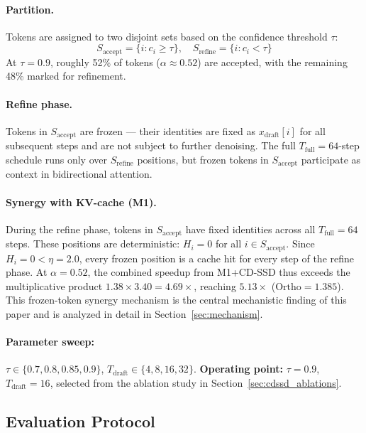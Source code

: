 \documentclass{article}
\newcommand{\ortho}{\text{Ortho}}
\newcommand{\Saccept}{S_{\text{accept}}}
\newcommand{\Srefine}{S_{\text{refine}}}
\newcommand{\Tdraft}{T_{\text{draft}}}
\newcommand{\Tfull}{T_{\text{full}}}
\newcommand{\xdraft}{x_{\text{draft}}}
\begin{document}
\paragraph{Partition.} Tokens are assigned to two disjoint sets based on the confidence threshold
$\tau$:
\begin{equation}
  \Saccept = \{i : c_i \geq \tau\}, \quad \Srefine = \{i : c_i < \tau\}
\end{equation}
At $\tau = 0.9$, roughly 52\% of tokens ($\alpha \approx 0.52$) are accepted, with the remaining
48\% marked for refinement.

\paragraph{Refine phase.} Tokens in $\Saccept$ are frozen --- their identities are fixed as
$\xdraft[i]$ for all subsequent steps and are not subject to further denoising. The full
$\Tfull = 64$-step schedule runs only over $\Srefine$ positions, but frozen tokens in $\Saccept$
participate as context in bidirectional attention.

\paragraph{Synergy with KV-cache (M1).} During the refine phase, tokens in $\Saccept$ have fixed
identities across all $\Tfull = 64$ steps. These positions are deterministic: $H_i = 0$ for all
$i \in \Saccept$. Since $H_i = 0 < \eta = 2.0$, every frozen position is a cache hit for every
step of the refine phase. At $\alpha = 0.52$, the combined speedup from M1+CD-SSD thus exceeds
the multiplicative product $1.38 \times 3.40 = 4.69\times$, reaching $5.13\times$
($\ortho = 1.385$). This frozen-token synergy mechanism is the central mechanistic finding of this
paper and is analyzed in detail in Section~\ref{sec:mechanism}.

\paragraph{Parameter sweep:} $\tau \in \{0.7, 0.8, 0.85, 0.9\}$, $\Tdraft \in \{4, 8, 16, 32\}$.
\textbf{Operating point:} $\tau = 0.9$, $\Tdraft = 16$, selected from the ablation study in
Section~\ref{sec:cdssd_ablations}.

\subsection{Evaluation Protocol}
\label{sec:protocol}
\end{document}
